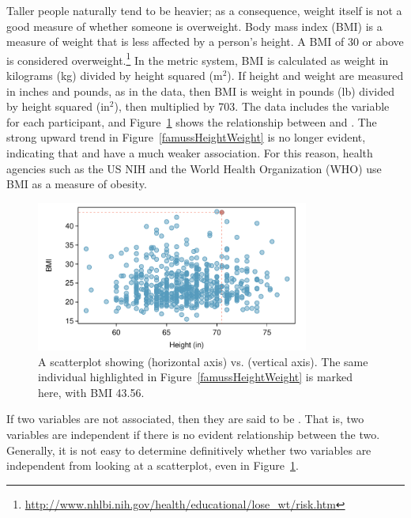 \begin{doublespace}
Taller people naturally tend to be heavier; as a consequence, weight itself is not a good measure of whether someone is overweight. Body mass index (BMI) is a measure of weight that is less affected by a person's height. A BMI of 30 or above is considered overweight.\footnote{\url{http://www.nhlbi.nih.gov/health/educational/lose_wt/risk.htm}} In the metric system, BMI is calculated as weight in kilograms (kg) divided by height squared ($\textrm {m}^{2}$). If height and weight are measured in inches and pounds, as in the  data, then BMI is weight in pounds (lb) divided by height squared ($\textrm {in}^{2}$), then multiplied by 703. The  data includes the variable  for each participant, and Figure~\ref{famussHeightBmi} shows the relationship between  and . The strong upward trend in Figure~\ref{famussHeightWeight} is no longer evident, indicating that  and  have a much weaker association. For this reason, health agencies such as the US NIH and the World Health Organization (WHO) use BMI as a measure of obesity. 

\begin{figure}
\centering
\includegraphics[width=0.8\textwidth]
{ch_intro_to_data_oi_biostat/figures/famussHeightBmi/famussHeightBmi.pdf}
\caption{A scatterplot showing  (horizontal axis) vs.   (vertical axis). The same individual highlighted in Figure~\ref{famussHeightWeight} is marked here, with BMI 43.56.} 
\label{famussHeightBmi}
\end{figure}

If two variables are not associated, then they are said to be . That is, two variables are independent if there is no evident relationship between the two.  Generally, it is not easy to determine definitively whether two variables are independent from looking at a scatterplot, even in Figure~\ref{famussHeightBmi}.



\end{doublespace}
